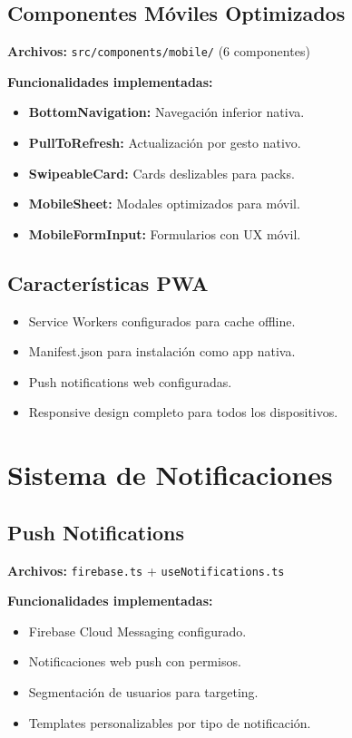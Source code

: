 \documentclass[a4paper,12pt]{article}
\begin{document}
\subsection{Componentes Móviles Optimizados}
\textbf{Archivos:} \texttt{src/components/mobile/} (6 componentes)

\textbf{Funcionalidades implementadas:}
\begin{itemize}
  \item \textbf{BottomNavigation:} Navegación inferior nativa.
  \item \textbf{PullToRefresh:} Actualización por gesto nativo.
  \item \textbf{SwipeableCard:} Cards deslizables para packs.
  \item \textbf{MobileSheet:} Modales optimizados para móvil.
  \item \textbf{MobileFormInput:} Formularios con UX móvil.
\end{itemize}

\subsection{Características PWA}
\begin{itemize}
  \item Service Workers configurados para cache offline.
  \item Manifest.json para instalación como app nativa.
  \item Push notifications web configuradas.
  \item Responsive design completo para todos los dispositivos.
\end{itemize}

\section{Sistema de Notificaciones}

\subsection{Push Notifications}
\textbf{Archivos:} \texttt{firebase.ts} + \texttt{useNotifications.ts}

\textbf{Funcionalidades implementadas:}
\begin{itemize}
  \item Firebase Cloud Messaging configurado.
  \item Notificaciones web push con permisos.
  \item Segmentación de usuarios para targeting.
  \item Templates personalizables por tipo de notificación.
\end{itemize}
\end{document}
